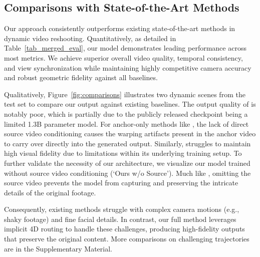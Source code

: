 \subsection{Comparisons with State-of-the-Art Methods}
\label{sec:comparisons}

Our approach consistently outperforms existing state-of-the-art methods in dynamic video reshooting. Quantitatively, as detailed in Table~\ref{tab_merged_eval}, our model demonstrates leading performance across most metrics. We achieve superior overall video quality, temporal consistency, and view synchronization while maintaining highly competitive camera accuracy and robust geometric fidelity against all baselines.

Qualitatively, Figure~\ref{fig:comparisons} illustrates two dynamic scenes from the test set to compare our output against existing baselines. The output quality of \recammaster{} is notably poor, which is partially due to the publicly released checkpoint being a limited 1.3B parameter model. For anchor-only methods like \exfd{}, the lack of direct source video conditioning causes the warping artifacts present in the anchor video to carry over directly into the generated output. Similarly, \trajectorycrafter{} struggles to maintain high visual fidelity due to limitations within its underlying training setup. To further validate the necessity of our architecture, we visualize our model trained without source video conditioning (`Ours w/o Source'). Much like \exfd{}, omitting the source video prevents the model from capturing and preserving the intricate details of the original footage.

Consequently, existing methods struggle with complex camera motions (e.g., shaky footage) and fine facial details. In contrast, our full method leverages implicit 4D routing to handle these challenges, producing high-fidelity outputs that preserve the original content. More comparisons on challenging trajectories are in the Supplementary Material.







